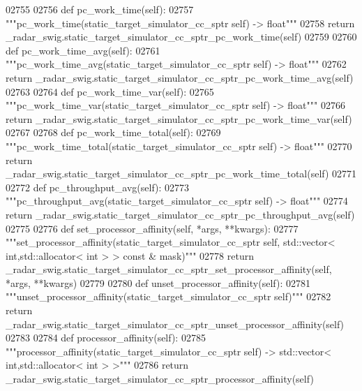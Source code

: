\begin{DoxyCode}
{{{{{{{{{{02755 
02756     \textcolor{keyword}{def }pc_work_time(self):
02757         \textcolor{stringliteral}{"""pc\_work\_time(static\_target\_simulator\_cc\_sptr self) -> float"""}
02758         \textcolor{keywordflow}{return} \_radar\_swig.static\_target\_simulator\_cc\_sptr\_pc\_work\_time(self)
02759 
02760     \textcolor{keyword}{def }pc_work_time_avg(self):
02761         \textcolor{stringliteral}{"""pc\_work\_time\_avg(static\_target\_simulator\_cc\_sptr self) -> float"""}
02762         \textcolor{keywordflow}{return} \_radar\_swig.static\_target\_simulator\_cc\_sptr\_pc\_work\_time\_avg(self)
02763 
02764     \textcolor{keyword}{def }pc_work_time_var(self):
02765         \textcolor{stringliteral}{"""pc\_work\_time\_var(static\_target\_simulator\_cc\_sptr self) -> float"""}
02766         \textcolor{keywordflow}{return} \_radar\_swig.static\_target\_simulator\_cc\_sptr\_pc\_work\_time\_var(self)
02767 
02768     \textcolor{keyword}{def }pc_work_time_total(self):
02769         \textcolor{stringliteral}{"""pc\_work\_time\_total(static\_target\_simulator\_cc\_sptr self) -> float"""}
02770         \textcolor{keywordflow}{return} \_radar\_swig.static\_target\_simulator\_cc\_sptr\_pc\_work\_time\_total(self)
02771 
02772     \textcolor{keyword}{def }pc_throughput_avg(self):
02773         \textcolor{stringliteral}{"""pc\_throughput\_avg(static\_target\_simulator\_cc\_sptr self) -> float"""}
02774         \textcolor{keywordflow}{return} \_radar\_swig.static\_target\_simulator\_cc\_sptr\_pc\_throughput\_avg(self)
02775 
02776     \textcolor{keyword}{def }set_processor_affinity(self, *args, **kwargs):
02777         \textcolor{stringliteral}{"""set\_processor\_affinity(static\_target\_simulator\_cc\_sptr self, std::vector< int,std::allocator<
       int > > const & mask)"""}
02778         \textcolor{keywordflow}{return} \_radar\_swig.static\_target\_simulator\_cc\_sptr\_set\_processor\_affinity(self, *args, **kwargs)
02779 
02780     \textcolor{keyword}{def }unset_processor_affinity(self):
02781         \textcolor{stringliteral}{"""unset\_processor\_affinity(static\_target\_simulator\_cc\_sptr self)"""}
02782         \textcolor{keywordflow}{return} \_radar\_swig.static\_target\_simulator\_cc\_sptr\_unset\_processor\_affinity(self)
02783 
02784     \textcolor{keyword}{def }processor_affinity(self):
02785         \textcolor{stringliteral}{"""processor\_affinity(static\_target\_simulator\_cc\_sptr self) -> std::vector< int,std::allocator< int
       > >"""}
02786         \textcolor{keywordflow}{return} \_radar\_swig.static\_target\_simulator\_cc\_sptr\_processor\_affinity(self)
}}}}}}}}}}
\end{DoxyCode}
